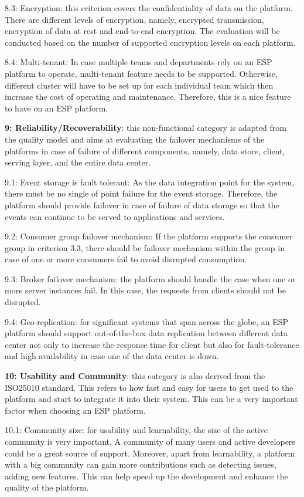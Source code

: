 8.3: Encryption: this criterion covers the confidentiality of data on the platform. There are different levels of encryption, namely, encrypted transmission, encryption of data at rest and end-to-end encryption. The evaluation will be conducted based on the number of supported encryption levels on each platform.

8.4: Multi-tenant: In case multiple teams and departments rely on an ESP platform to operate, multi-tenant feature needs to be supported. Otherwise, different cluster will have to be set up for each individual team which then increase the cost of operating and maintenance. Therefore, this is a nice feature to have on an ESP platform.

\textbf{9: Reliability/Recoverability}: this non-functional category is adapted from the quality model and aims at evaluating the failover mechanisms of the platforms in case of failure of different components, namely, data store, client, serving layer, and the entire data center.

9.1: Event storage is fault tolerant: As the data integration point for the system, there must be no single of point failure for the event storage. Therefore, the platform should provide failover in case of failure of data storage so that the events can continue to be served to applications and services.

9.2: Consumer group failover mechanism: If the platform supports the consumer group in criterion 3.3, there should be failover mechanism within the group in case of one or more consumers fail to avoid disrupted consumption.

9.3: Broker failover mechanism: the platform should handle the case when one or more server instances fail. In this case, the requests from clients should not be disrupted. 

9.4: Geo-replication: for significant systems that span across the globe, an ESP platform should support out-of-the-box data replication between different data center not only to increase the response time for client but also for fault-tolerance and high availability in case one of the data center is down.

\textbf{10: Usability and Community}: this category is also derived from the ISO25010 standard. This refers to how fast and easy for users to get used to the platform and start to integrate it into their system. This can be a very important factor when choosing an ESP platform. 

10.1: Community size: for usability and learnability, the size of the active community is very important. A community of many users and active developers could be a great source of support. Moreover, apart from learnability, a platform with a big community can gain more contributions such as detecting issues, adding new features. This can help speed up the development and enhance the quality of the platform.

